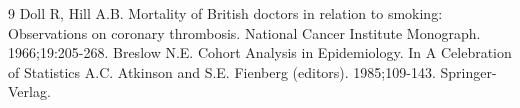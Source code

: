 \documentclass[10pt,a4paper,twoside]{article}\usepackage[]{graphicx}\usepackage[]{xcolor}
\begin{document}
\newpage
\begin{thebibliography}{9}
 Doll R, Hill A.B. Mortality of British doctors in relation to smoking: Observations on coronary thrombosis. National Cancer Institute Monograph. 1966;19:205-268.
 Breslow N.E. Cohort Analysis in Epidemiology. In A Celebration of Statistics A.C. Atkinson and S.E. Fienberg (editors). 1985;109-143. Springer-Verlag.
\end{thebibliography}
\end{document}
